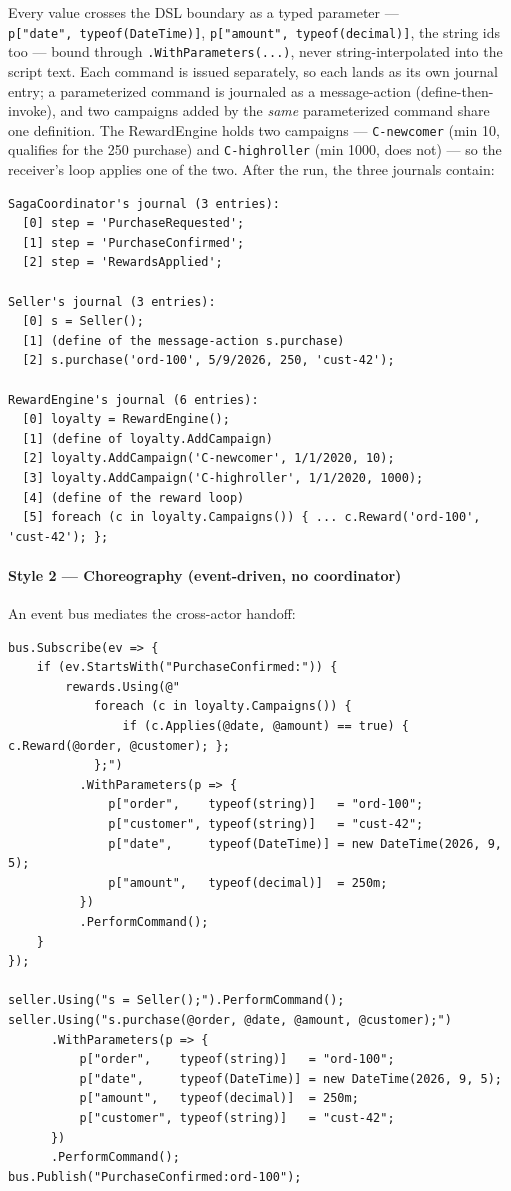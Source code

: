 \documentclass[
]{article}
\let\origtexttt\texttt%
\renewcommand{\texttt}[1]{\origtexttt{\seqsplit{#1}}}%
\let\texttt\origtexttt%
\begin{document}
Every value crosses the DSL boundary as a typed parameter ---
\texttt{p{[}"date",\ typeof(DateTime){]}},
\texttt{p{[}"amount",\ typeof(decimal){]}}, the string ids too --- bound
through \texttt{.WithParameters(...)}, never string-interpolated into
the script text. Each command is issued separately, so each lands as its
own journal entry; a parameterized command is journaled as a
message-action (define-then-invoke), and two campaigns added by the
\emph{same} parameterized command share one definition. The RewardEngine
holds two campaigns --- \texttt{C-newcomer} (min 10, qualifies for the
250 purchase) and \texttt{C-highroller} (min 1000, does not) --- so the
receiver's loop applies one of the two. After the run, the three
journals contain:

\begin{verbatim}
SagaCoordinator's journal (3 entries):
  [0] step = 'PurchaseRequested';
  [1] step = 'PurchaseConfirmed';
  [2] step = 'RewardsApplied';

Seller's journal (3 entries):
  [0] s = Seller();
  [1] (define of the message-action s.purchase)
  [2] s.purchase('ord-100', 5/9/2026, 250, 'cust-42');

RewardEngine's journal (6 entries):
  [0] loyalty = RewardEngine();
  [1] (define of loyalty.AddCampaign)
  [2] loyalty.AddCampaign('C-newcomer', 1/1/2020, 10);
  [3] loyalty.AddCampaign('C-highroller', 1/1/2020, 1000);
  [4] (define of the reward loop)
  [5] foreach (c in loyalty.Campaigns()) { ... c.Reward('ord-100', 'cust-42'); };
\end{verbatim}

\paragraph{Style 2 --- Choreography (event-driven, no
coordinator)}\label{style-2-choreography-event-driven-no-coordinator}

An event bus mediates the cross-actor handoff:

\begin{verbatim}
bus.Subscribe(ev => {
    if (ev.StartsWith("PurchaseConfirmed:")) {
        rewards.Using(@"
            foreach (c in loyalty.Campaigns()) {
                if (c.Applies(@date, @amount) == true) { c.Reward(@order, @customer); };
            };")
          .WithParameters(p => {
              p["order",    typeof(string)]   = "ord-100";
              p["customer", typeof(string)]   = "cust-42";
              p["date",     typeof(DateTime)] = new DateTime(2026, 9, 5);
              p["amount",   typeof(decimal)]  = 250m;
          })
          .PerformCommand();
    }
});

seller.Using("s = Seller();").PerformCommand();
seller.Using("s.purchase(@order, @date, @amount, @customer);")
      .WithParameters(p => {
          p["order",    typeof(string)]   = "ord-100";
          p["date",     typeof(DateTime)] = new DateTime(2026, 9, 5);
          p["amount",   typeof(decimal)]  = 250m;
          p["customer", typeof(string)]   = "cust-42";
      })
      .PerformCommand();
bus.Publish("PurchaseConfirmed:ord-100");
\end{verbatim}
\end{document}
